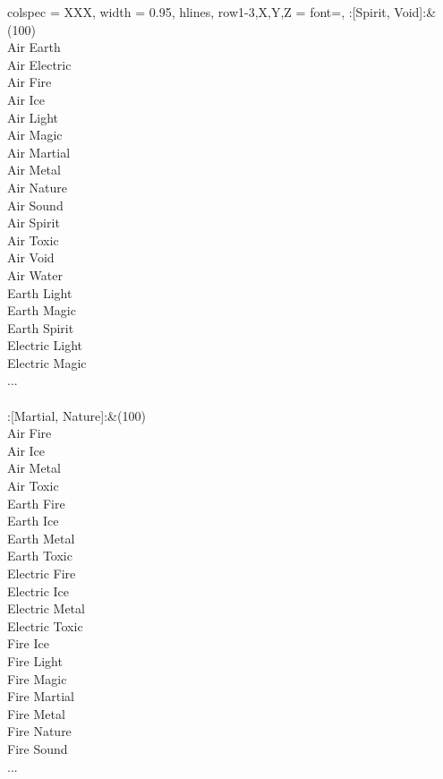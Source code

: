 \begin{longtblr}[
	caption = {2v2 Defending Weak},
	label = {2v2-Defending-Weak},
]{
	colspec = {XXX}, width = 0.95\linewidth,
	hlines,
	row{1-3,X,Y,Z} = {font=\bfseries},
}
	:[Spirit, Void]:&{(100)\\
	Air Earth \\
	Air Electric \\
	Air Fire \\
	Air Ice \\
	Air Light \\
	Air Magic \\
	Air Martial \\
	Air Metal \\
	Air Nature \\
	Air Sound \\
	Air Spirit \\
	Air Toxic \\
	Air Void \\
	Air Water \\
	Earth Light \\
	Earth Magic \\
	Earth Spirit \\
	Electric Light \\
	Electric Magic \\
	...\\
	}\\

	:[Martial, Nature]:&{(100)\\
	Air Fire \\
	Air Ice \\
	Air Metal \\
	Air Toxic \\
	Earth Fire \\
	Earth Ice \\
	Earth Metal \\
	Earth Toxic \\
	Electric Fire \\
	Electric Ice \\
	Electric Metal \\
	Electric Toxic \\
	Fire Ice \\
	Fire Light \\
	Fire Magic \\
	Fire Martial \\
	Fire Metal \\
	Fire Nature \\
	Fire Sound \\
	...\\
	}\\


\end{longtblr}
